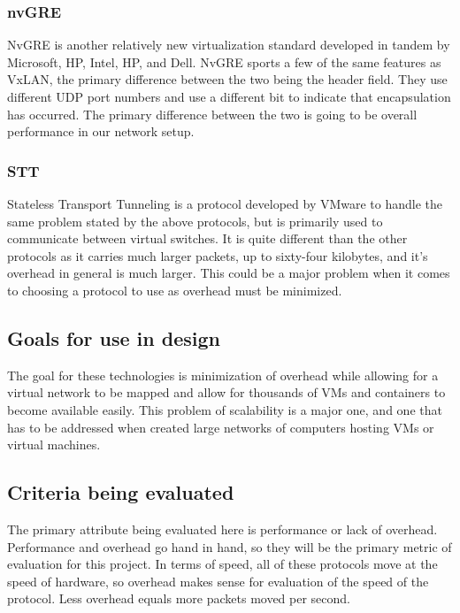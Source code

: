 \documentclass[10pt,letterpaper,onecolumn,draftclsnofoot]{IEEEtran}
\begin{document}
\subsubsection{nvGRE}
NvGRE is another relatively new virtualization standard developed in tandem by
Microsoft, HP, Intel, HP, and Dell.\cite{nvgre-info} NvGRE sports a few of the
same features as VxLAN, the primary difference between the two being the header
field. They use different UDP port numbers and use a different bit to indicate
that encapsulation has occurred.\cite{nvgre} The primary difference between the
two is going to be overall performance in our network setup.

\subsubsection{STT}
Stateless Transport Tunneling is a protocol developed by VMware to handle the
same problem stated by the above protocols, but is primarily used to communicate
between virtual switches. It is quite different than the other protocols as it
carries much larger packets, up to sixty-four kilobytes, and it's overhead in
general is much larger. This could be a major problem when it comes to choosing
a protocol to use as overhead must be minimized.

\subsection{Goals for use in design}
The goal for these technologies is minimization of overhead while allowing for a
virtual network to be mapped and allow for thousands of VMs and containers to
become available easily. This problem of scalability is a major one, and one
that has to be addressed when created large networks of computers hosting VMs or
virtual machines.

\subsection{Criteria being evaluated}
The primary attribute being evaluated here is performance or lack of overhead.
Performance and overhead go hand in hand, so they will be the primary metric of
evaluation for this project. In terms of speed, all of these protocols move at
the speed of hardware, so overhead makes sense for evaluation of the speed of
the protocol. Less overhead equals more packets moved per second.
\end{document}
